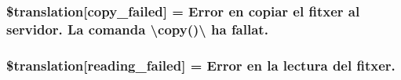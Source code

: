 \subsubsection[{\$translation}]{\setlength{\rightskip}{0pt plus 5cm}\$translation\mbox{[}\textquotesingle{}copy\+\_\+failed\textquotesingle{}\mbox{]} = \textquotesingle{}Error en copiar el fitxer al servidor. La comanda \textbackslash{}\textquotesingle{}copy()\textbackslash{}\textquotesingle{} ha fallat.\textquotesingle{}}\label{class_8upload_8ca___c_a_8php_a783c9358bcf54a054545b50098bc679b}
\hypertarget{class_8upload_8ca___c_a_8php_a01bea14c9fd5f353f62db44beabfcd42}{}
\subsubsection[{\$translation}]{\setlength{\rightskip}{0pt plus 5cm}\$translation\mbox{[}\textquotesingle{}reading\+\_\+failed\textquotesingle{}\mbox{]} = \textquotesingle{}Error en la lectura del fitxer.\textquotesingle{}}\label{class_8upload_8ca___c_a_8php_a01bea14c9fd5f353f62db44beabfcd42}
